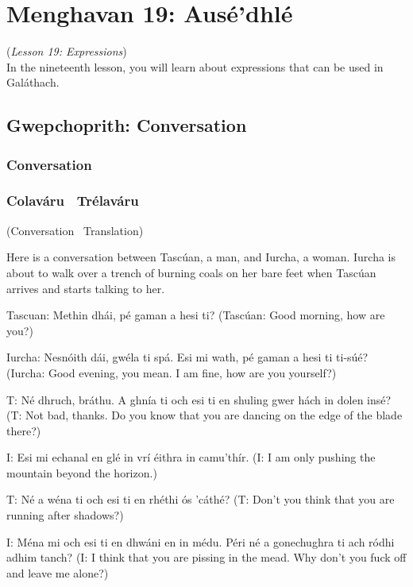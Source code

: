 \section{Menghavan 19: Aus\'{e'}dhl\'{e}}
(\textit{Lesson 19: Expressions})\\

In the nineteenth lesson, you will learn about expressions that can be used in Gal\'{a}thach.

\subsection{Gwepchoprith: Conversation}
\subsubsection{Conversation}

\subsubsection{Colav\'{a}ru \textendash\ Tr\'{e}lav\'{a}ru}
(Conversation \textendash\ Translation)

Here is a conversation between Tasc\'{u}an, a man, and Iurcha, a woman. Iurcha is about to walk over a trench of burning coals on her bare feet when Tasc\'{u}an arrives and starts talking to her.

Tascuan: Methin dh\'{a}i, p\'{e} gaman a hesi ti?
(Tasc\'{u}an: Good morning, how are you?)

Iurcha: Nesn\'{o}ith d\'{a}i, gw\'{e}la ti sp\'{a}. Esi mi wath, p\'{e} gaman a hesi ti ti-s\'{u}\'{e}?
(Iurcha: Good evening, you mean. I am fine, how are you yourself?)

T: N\'{e} dhruch, br\'{a}thu. A ghn\'{i}a ti och esi ti en shuling gwer h\'{a}ch in dolen ins\'{e}?
(T: Not bad, thanks. Do you know that you are dancing on the edge of the blade there?)

I: Esi mi echanal en gl\'{e} in vr\'{i} \'{e}ithra in camu'th\'{i}r.
(I: I am only pushing the mountain beyond the horizon.)

T: N\'{e} a w\'{e}na ti och esi ti en rh\'{e}thi \'{o}s 'c\'{a}th\'{e}?
(T: Don't you think that you are running after shadows?)

I: M\'{e}na mi och esi ti en dhw\'{a}ni en in m\'{e}du. P\'{e}ri n\'{e} a gonechughra ti ach r\'{o}dhi adhim tanch?
(I: I think that you are pissing in the mead. Why don't you fuck off and leave me alone?)

